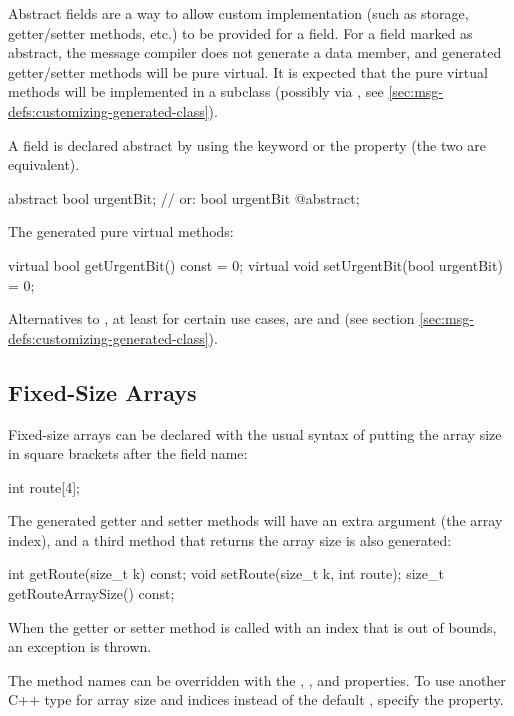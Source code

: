 Abstract fields are a way to allow custom implementation (such as storage,
getter/setter methods, etc.) to be provided for a field. For a field marked as
abstract, the message compiler does not generate a data member, and generated
getter/setter methods will be pure virtual. It is expected that the pure virtual
methods will be implemented in a subclass (possibly via , see
\ref{sec:msg-defs:customizing-generated-class}).

A field is declared abstract by using the  keyword or the
 property (the two are equivalent).

\begin{msg}
abstract bool urgentBit; // or: bool urgentBit @abstract;
\end{msg}

The generated pure virtual methods:

\begin{cpp}
virtual bool getUrgentBit() const = 0;
virtual void setUrgentBit(bool urgentBit) = 0;
\end{cpp}

Alternatives to , at least for certain use cases, are
 and  (see section
\ref{sec:msg-defs:customizing-generated-class}).


\subsection{Fixed-Size Arrays}
\label{sec:msg-defs:fixed-size-arrays}

Fixed-size arrays can be declared with the usual syntax of putting the array
size in square brackets after the field name:

\begin{msg}
int route[4];
\end{msg}

The generated getter and setter methods will have an extra  argument (the
array index), and a third method that returns the array size is also generated:

\begin{cpp}
int getRoute(size_t k) const;
void setRoute(size_t k, int route);
size_t getRouteArraySize() const;
\end{cpp}

When the getter or setter method is called with an index that is out of bounds,
an exception is thrown.

The method names can be overridden with the , ,
and  properties. To use another C++ type for array size and
indices instead of the default , specify the 
property.


